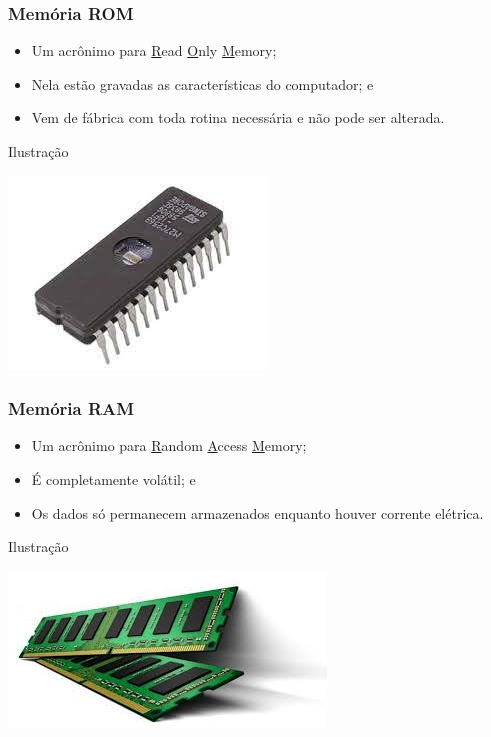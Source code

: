 \documentclass[aspectratio=169]{beamer} %
\begin{document}
\begin{frame}
	\frametitle{Memória ROM}
		
	\begin{itemize}
		\item Um acrônimo para \underline{R}ead \underline{O}nly \underline{M}emory;
		\item Nela estão gravadas as características do computador; e
		\item Vem de fábrica com toda rotina necessária e não pode ser alterada.
	\end{itemize}\vfill
	
	\begin{exampleblock}{Ilustra\c cão}
		\begin{center}
			\includegraphics[scale=0.4]{img/rom}
		\end{center}		
	\end{exampleblock}
\end{frame}

\begin{frame}
	\frametitle{Memória RAM}
		
	\begin{itemize}
		\item Um acrônimo para \underline{R}andom \underline{A}ccess \underline{M}emory; 
		\item É completamente volátil; e
		\item Os dados só permanecem armazenados enquanto houver corrente elétrica.
	\end{itemize}\vfill
	
	\begin{exampleblock}{Ilustra\c cão}
		\begin{center}
			\includegraphics[scale=0.4]{img/ram}
		\end{center}		
	\end{exampleblock}
\end{frame}
\end{document}
